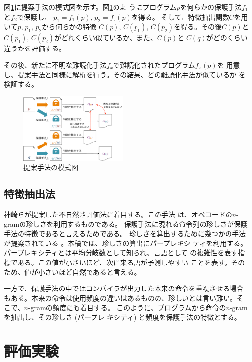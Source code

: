 \documentclass[a4j,fleqn,10pt]{jarticle}
\newcommand{\birth}[1]{$C(#1)$}
\begin{document}
図\ref{fig:overview}に提案手法の模式図を示す。図\ref{fig:overview}のよ
うにプログラム$p$を何らかの保護手法$f_1$と$f_2$で保護し、
$p_1=f_1(p)$, $p_2=f_2(p)$を得る。
%
そして、特徴抽出関数$C$を用いて$p$, $p_1$, $p_2$から何らかの特徴
\birth{p}, \birth{p_1}, \birth{p_2}を得る。その後\birth{p}と
\birth{p_1}, \birth{p_2}がどれくらい似ているか、また、\birth{p}と
\birth{q}がどのくらい違うかを評価する。

その後、新たに不明な難読化手法$f_x$で難読化されたプログラム$f_x(p)$を
用意し、提案手法と同様に解析を行う。その結果、どの難読化手法が似ているか
を検証する。

\begin{figure}[b]
  \centering
  \includegraphics[width=0.48\textwidth]{overview}
  \caption{提案手法の模式図}\label{fig:overview}
\end{figure}

\subsection{特徴抽出法}\label{sect:method}

神崎らが提案した不自然さ評価法に着目する\cite{kanzaki14ipsj}。この手法
は、オペコードの$n$-gramの珍しさを利用するものである。
%
保護手法に現れる命令列の珍しさが保護手法の特徴であると言えるためである。
珍しさを算出するために幾つかの手法が提案されている
\cite{kanzaki14ipsj,gekka14scis}。本稿では、珍しさの算出にパープレキシ
ティを利用する。パープレキシティとは平均分岐数として知られ、言語として
の複雑性を表す指標である。この値が小さいほど、次に来る語が予測しやすい
ことを表す。そのため、値が小さいほど自然であると言える。

一方で、保護手法の中ではコンパイラが出力した本来の命令を重複させる場合
もある。本来の命令は使用頻度の違いはあるものの、珍しいとは言い難い。そ
こで、$n$-gramの頻度にも着目する。
%
このように、プログラムから命令の$n$-gramを抽出し、その珍しさ (パープレ
  キシティ) と頻度を保護手法の特徴とする。

\section{評価実験}\label{sect:experiments}
\end{document}
